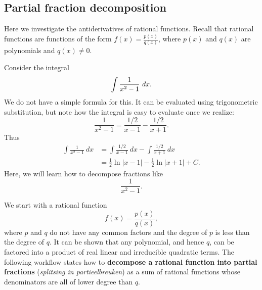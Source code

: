 \subsection{Partial fraction decomposition}\label{sec:partial_fraction}


\ifcourse
	\checkoddpage
{}
 \fi
Here we investigate the antiderivatives of rational functions. Recall that rational functions are functions of the form $f(x)= \frac{p(x)}{q(x)}$, where $p(x)$ and $q(x)$ are polynomials and $q(x)\neq 0$. 

Consider the integral 
$$\displaystyle\int \frac{1}{x^2-1}\ dx.$$
 We do not have a simple formula for this. It can be evaluated using trigonometric substitution, but note how the integral is easy to evaluate once we realize:
$$\frac{1}{x^2-1} = \frac{1/2}{x-1} - \frac{1/2}{x+1}.$$
Thus 
\begin{align*}
\int\frac{1}{x^2-1}\ dx &= \int\frac{1/2}{x-1}\ dx - \int\frac{1/2}{x+1}\ dx \\
			&= \frac12\ln|x-1| - \frac12\ln|x+1| + C.
\end{align*}
Here, we will learn how to decompose fractions like  $$\frac{1}{x^2-1}.$$

We start with a rational function 
$$f(x)=\frac{p(x)}{q(x)},$$
where $p$ and $q$ do not have any common factors and the degree of $p$ is less than the degree of $q$. It can be shown that any polynomial, and hence $q$, can be factored into a product of real linear and irreducible quadratic terms. The following workflow states how to \textbf{decompose a rational function into partial fractions} (\textit{splitsing in partieelbreuken}) as a sum of rational functions whose denominators are all of lower degree than $q$.

